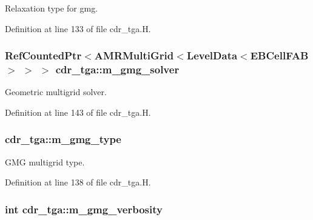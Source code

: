 Relaxation type for gmg. 



Definition at line 133 of file cdr\+\_\+tga.\+H.

\subsubsection[{\texorpdfstring{m\+\_\+gmg\+\_\+solver}{m_gmg_solver}}]{\setlength{\rightskip}{0pt plus 5cm}Ref\+Counted\+Ptr$<$A\+M\+R\+Multi\+Grid$<$Level\+Data$<$E\+B\+Cell\+F\+AB$>$ $>$ $>$ cdr\+\_\+tga\+::m\+\_\+gmg\+\_\+solver\hspace{0.3cm}{\ttfamily [protected]}}\hypertarget{classcdr__tga_ab3222ef3ea322d5a4dc32c1692812794}{}\label{classcdr__tga_ab3222ef3ea322d5a4dc32c1692812794}


Geometric multigrid solver. 



Definition at line 143 of file cdr\+\_\+tga.\+H.

\subsubsection[{\texorpdfstring{m\+\_\+gmg\+\_\+type}{m_gmg_type}}]{ cdr\+\_\+tga\+::m\+\_\+gmg\+\_\+type\hspace{0.3cm}{\ttfamily [protected]}}\hypertarget{classcdr__tga_a0731f3db4b058621e8430d1c0c02c19c}{}\label{classcdr__tga_a0731f3db4b058621e8430d1c0c02c19c}


G\+MG multigrid type. 



Definition at line 138 of file cdr\+\_\+tga.\+H.

\subsubsection[{\texorpdfstring{m\+\_\+gmg\+\_\+verbosity}{m_gmg_verbosity}}]{\setlength{\rightskip}{0pt plus 5cm}int cdr\+\_\+tga\+::m\+\_\+gmg\+\_\+verbosity\hspace{0.3cm}{\ttfamily [protected]}}\hypertarget{classcdr__tga_a42454cdf64ab18cd6df2c8ce97a361d8}{}\label{classcdr__tga_a42454cdf64ab18cd6df2c8ce97a361d8}


